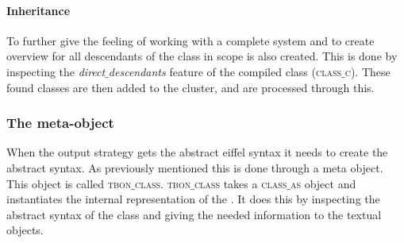 \paragraph{Inheritance}
To further give the feeling of working with a complete system and to create overview \bon{ } for all descendants of the class in scope is also created. This is done by inspecting the \textit{direct$\_$descendants} feature of the compiled class (\textsc{class$\_$c}). These found classes are then added to the cluster, and are processed through this.

\subsubsection{The meta-object}
\label{tbon_class}
When the output strategy gets the abstract eiffel syntax it needs to create the abstract syntax. As previously mentioned this is done through a meta object. This object is called \textsc{tbon$\_$class}. \textsc{tbon$\_$class} takes a \textsc{class$\_$as} object and instantiates the internal representation of the \bon{}. It does this by inspecting the abstract syntax of the class and giving the needed information to the textual \bon{ } objects.
